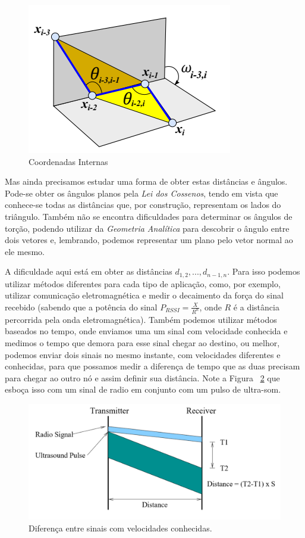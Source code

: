 \documentclass[11pt]{article}
\begin{document}
\begin{figure}[h!]
	\begin{center}
		\includegraphics[width=0.5\linewidth]{cooint.png}
	\end{center}
	\caption{Coordenadas Internas}
	\label{fig:angulos}
\end{figure}

Mas ainda precisamos estudar uma forma de obter estas distâncias e ângulos. Pode-se obter os ângulos planos pela \textit{Lei dos Cossenos}, tendo em vista que conhece-se todas as distâncias que, por construção, representam os lados do triângulo. Também não se encontra dificuldades para determinar os ângulos de torção, podendo utilizar da \textit{Geometria Analítica} para descobrir o ângulo entre dois vetores e, lembrando, podemos representar um plano pelo vetor normal ao ele mesmo.

A dificuldade aqui está em obter as distâncias $d_{1,2}, ..., d_{n - 1,n}$. Para isso podemos utilizar métodos diferentes para cada tipo de aplicação, como, por exemplo, utilizar comunicação eletromagnética e medir o decaimento da força do sinal recebido (sabendo que a potência do sinal $P_{RSSI} = \frac{X}{R^n}$, onde $R$ é a distância percorrida pela onda eletromagnética). Também podemos utilizar métodos baseados no tempo, onde enviamos uma um sinal com velocidade conhecida e medimos o tempo que demora para esse sinal chegar ao destino, ou melhor, podemos enviar dois sinais no mesmo instante, com velocidades diferentes e conhecidas, para que possamos medir a diferença de tempo que as duas precisam para chegar ao outro nó e assim definir sua distância. Note a Figura ~\ref{fig:TDoA} que esboça isso com um sinal de radio em conjunto com um pulso de ultra-som.

\begin{figure}[h!]
	\begin{center}
		\includegraphics[width=0.8\linewidth]{TDoA.png}
	\end{center}
	\caption{Diferença entre sinais com velocidades conhecidas.}
	\label{fig:TDoA}
\end{figure}
\end{document}
